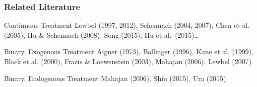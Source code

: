 \documentclass{beamer}
\begin{document}
\begin{frame}[label=MAHAJAN_BODY]
  \frametitle{Related Literature}
 
  \begin{block}{Continuous Treatment}
    \small
  Lewbel (1997, 2012), Schennach (2004, 2007), Chen et al. (2005), Hu \& Schennach (2008), Song (2015), Hu et al.\ (2015)\ldots 
  \end{block}

  \begin{block}{Binary, Exogenous Treatment}
    \small
   Aigner (1973), Bollinger (1996), Kane et al. (1999), Black et al. (2000), Frazis \& Loewenstein (2003), Mahajan (2006), Lewbel (2007) 
  \end{block}

  \begin{block}{Binary, Endogenous Treatment}
    \alert{Mahajan (2006)}, \small Shiu (2015), Ura (2015) 
  \end{block}
    \hyperlink{MAHAJAN_APPEND}{}
\end{frame}
%    
%
\end{document}
